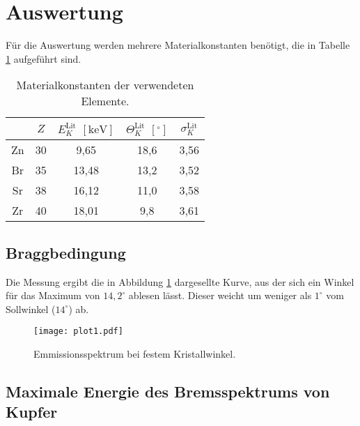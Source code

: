 \section{Auswertung}
\label{sec:Auswertung}

Für die Auswertung werden mehrere Materialkonstanten benötigt, die in Tabelle \ref{tab:material} aufgeführt sind.

\begin{table}
  \centering
  \caption{Materialkonstanten der verwendeten Elemente.}
  \label{tab:material}
  \begin{tabular}{c c c c c}
    \toprule
    & $Z$ & $E^\text{Lit}_K$ $[\si{\kilo\eV}]$ & $\Theta^\text{Lit}_K$ $[^\circ]$ & $\sigma^\text{Lit}_K$ \\
    \midrule
    Zn & 30 & 9,65 & 18,6 & 3,56 \\
    Br & 35 & 13,48 & 13,2 & 3,52 \\
    Sr & 38 & 16,12 & 11,0 & 3,58 \\
    Zr & 40 & 18,01 & 9,8 & 3,61 \\
    \bottomrule
  \end{tabular}
\end{table}

\subsection{Braggbedingung}

Die Messung ergibt die in Abbildung \ref{fig:plot1} dargesellte Kurve, aus der sich ein Winkel für das Maximum von $14,2^\circ$ ablesen lässt.
Dieser weicht um weniger als $1^\circ$ vom Sollwinkel ($14^\circ$) ab.
\begin{figure}
  \centering
  \texttt{[image: plot1.pdf]}
  \caption{Emmissionsspektrum bei festem Kristallwinkel.}
  \label{fig:plot1}
\end{figure}
\FloatBarrier

\subsection{Maximale Energie des Bremsspektrums von Kupfer}

